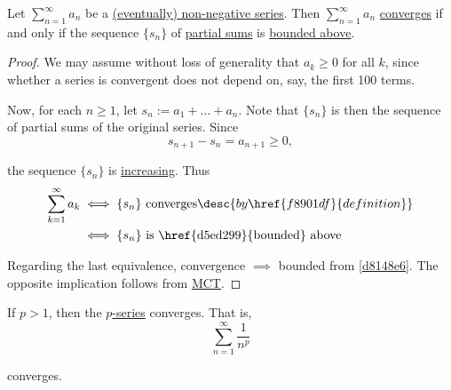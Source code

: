 \label{a6c7116}

Let $\sum_{n=1}^\infty a_n$ be a \href{b6cffeb}{(eventually) non-negative
series}. Then $\sum_{n=1}^\infty a_n$ \href{f8901df}{converges} if and only if
the sequence $\{s_n\}$ of \href{a835138}{partial sums} is
\href{d5ed299}{bounded above}.

\begin{proof}
  We may assume without loss of generality that $a_k\geq0$ for all $k$, since
  whether a series is convergent does not depend on, say, the first 100 terms.

  Now, for each $n\geq1$, let $s_n:=a_1+\ldots+a_n$. Note that $\{s_n\}$ is
  then the sequence of partial sums of the original series. Since
  $$
    s_{n+1}-s_n=a_{n+1}\geq0,
  $$

  the sequence $\{s_n\}$ is \href{feae1b2}{increasing}. Thus
  \begin{align*}
    \sum_{k=1}^\infty a_k &\iff\{s_n\}\text{ converges}\desc{by \href{f8901df}{definition}} \\
                          &\iff\{s_n\}\text{ is \href{d5ed299}{bounded} above}
  \end{align*}

  Regarding the last equivalence, convergence $\implies$ bounded from
  \autoref{d8148e6}. The opposite implication follows from \href{c28d9a9}{MCT}.
\end{proof}

\label{ae42184}

If $p>1$, then the \href{cccc2e8}{$p$-series} converges. That is,
$$
  \sum_{n=1}^\infty\frac1{n^p}
$$

converges.

